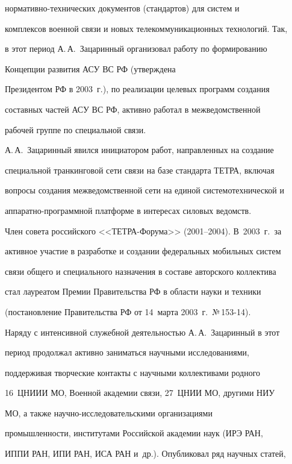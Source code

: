 нор\-ма\-тив\-но-тех\-ни\-че\-ских документов (стандартов) для сис\-тем и 


комплексов военной связи и новых телекоммуникационных технологий. Так, 


в этот период А.\,А.~Зацаринный организовал работу по формированию 


Концепции развития АСУ ВС РФ (утверждена 


Президентом РФ в 2003~г.), по реализации целевых программ создания 


составных частей АСУ ВС РФ, активно работал в межведомственной 


рабочей группе по специальной связи.





А.\,А.~Зацаринный явился инициатором работ, направленных на создание 


специальной транкинговой сети связи на базе стандарта ТЕТРА, включая 


вопросы создания межведомственной сети на единой системотехнической и 


ап\-па\-рат\-но-про\-грам\-мной платформе в интересах силовых ведомств. 


Член совета российского <<ТЕТРА-Фо\-ру\-ма>> (2001--2004). В~2003~г.\ за 


активное участие в разработке и создании федеральных мобильных сис\-тем 


связи общего и специального назначения в составе авторского коллектива 


стал лауреатом Премии Правительства РФ в области науки и техники 


(постановление Правительства РФ от 14~марта 2003~г.\ №\,153-14).





Наряду с интенсивной служебной деятельностью А.\,А.~Зацаринный в этот 


период продолжал активно заниматься научными исследованиями, 


поддерживая творческие контакты с научными коллективами родного 


16~ЦНИИИ МО, Военной академии связи, 27~ЦНИИ МО, другими НИУ 


МО, а также на\-уч\-но-ис\-сле\-до\-ва\-тель\-ски\-ми организациями 


промышленности, институтами Российской академии наук (ИРЭ РАН, 


ИППИ РАН, ИПИ РАН, ИСА РАН и~др.). Опуб\-ли\-ко\-вал ряд научных статей, 


